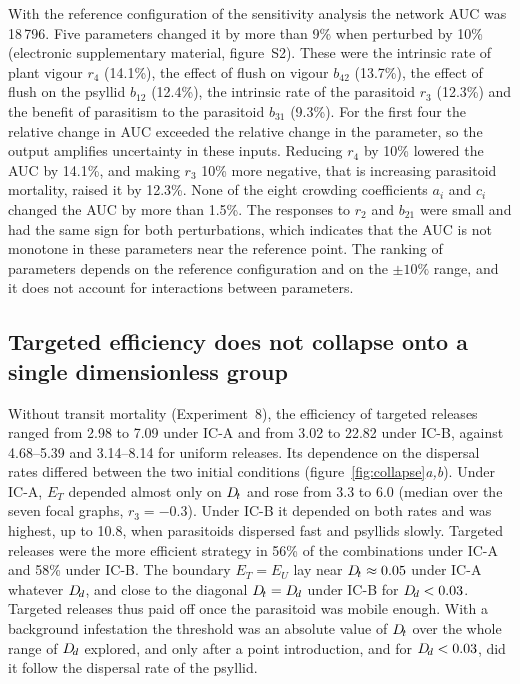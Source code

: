 With the reference configuration of the sensitivity analysis the network AUC was 18\,796. Five parameters changed it by more than 9\% when perturbed by 10\% (electronic supplementary material, figure~S2). These were the intrinsic rate of plant vigour $r_4$ (14.1\%), the effect of flush on vigour $b_{42}$ (13.7\%), the effect of flush on the psyllid $b_{12}$ (12.4\%), the intrinsic rate of the parasitoid $r_3$ (12.3\%) and the benefit of parasitism to the parasitoid $b_{31}$ (9.3\%). For the first four the relative change in AUC exceeded the relative change in the parameter, so the output amplifies uncertainty in these inputs. Reducing $r_4$ by 10\% lowered the AUC by 14.1\%, and making $r_3$ 10\% more negative, that is increasing parasitoid mortality, raised it by 12.3\%. None of the eight crowding coefficients $a_i$ and $c_i$ changed the AUC by more than 1.5\%. The responses to $r_2$ and $b_{21}$ were small and had the same sign for both perturbations, which indicates that the AUC is not monotone in these parameters near the reference point. The ranking of parameters depends on the reference configuration and on the $\pm10\%$ range, and it does not account for interactions between parameters.

\subsection{Targeted efficiency does not collapse onto a single dimensionless group}
\label{sec:res-collapse}

Without transit mortality (Experiment~8), the efficiency of targeted releases ranged from 2.98 to 7.09 under IC-A and from 3.02 to 22.82 under IC-B, against 4.68--5.39 and 3.14--8.14 for uniform releases. Its dependence on the dispersal rates differed between the two initial conditions (figure~\ref{fig:collapse}\emph{a,b}). Under IC-A, $E_T$ depended almost only on $D_{\!t}$ and rose from 3.3 to 6.0 (median over the seven focal graphs, $r_3 = -0.3$). Under IC-B it depended on both rates and was highest, up to 10.8, when parasitoids dispersed fast and psyllids slowly. Targeted releases were the more efficient strategy in 56\% of the combinations under IC-A and 58\% under IC-B. The boundary $E_T = E_U$ lay near $D_{\!t} \approx 0.05$ under IC-A whatever $D_{\!d}$, and close to the diagonal $D_{\!t} = D_{\!d}$ under IC-B for $D_{\!d} < 0.03$. Targeted releases thus paid off once the parasitoid was mobile enough. With a background infestation the threshold was an absolute value of $D_{\!t}$ over the whole range of $D_{\!d}$ explored, and only after a point introduction, and for $D_{\!d} < 0.03$, did it follow the dispersal rate of the psyllid.


